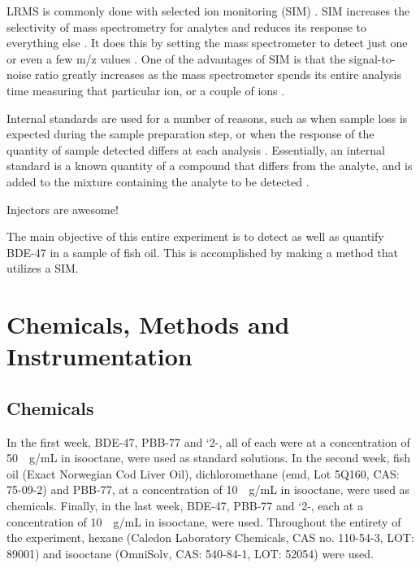 \documentclass[a4paper, 12pt]{article}
\begin{document}
LRMS is commonly done with selected ion monitoring (SIM) \cite{bjorklund_mass_2003}. SIM increases the selectivity of mass spectrometry for analytes and reduces its response to everything else \cite{harris}. It does this by setting the mass spectrometer to detect just one or even a few m/z values \cite{harris}. One of the advantages of SIM is that the signal-to-noise ratio greatly increases as the mass spectrometer spends its entire analysis time measuring that particular ion, or a couple of ions \cite{harris}.

Internal standards are used for a number of reasons, such as when sample loss is expected during the sample preparation step, or when the response of the quantity of sample detected differs at each analysis \cite{harris}. Essentially, an internal standard is a known quantity of a compound that differs from the analyte, and is added to the mixture containing the analyte to be detected \cite{harris}. 

Injectors are awesome!

The main objective of this entire experiment is to detect as well as quantify BDE-47 in a sample of fish oil. This is accomplished by making a method that utilizes a SIM.


\section{Chemicals, Methods and Instrumentation}

\subsection{Chemicals}
In the first week, BDE-47, PBB-77 and `2-, all of each were at a concentration of \SI{50}{\mu{}g/mL} in isooctane, were used as standard solutions. In the second week, fish oil (Exact Norwegian Cod Liver Oil), dichloromethane (emd, Lot 5Q160, CAS: 75-09-2) and PBB-77, at a concentration of \SI{10}{\mu{}g/mL} in isooctane, were used as chemicals. Finally, in the last week, BDE-47, PBB-77 and `2-, each at a concentration of \SI{10}{\mu{}g/mL} in isooctane, were used. Throughout the entirety of the experiment, hexane (Caledon Laboratory Chemicals, CAS no. 110-54-3, LOT: 89001) and isooctane (OmniSolv, CAS: 540-84-1, LOT: 52054) were used.
\end{document}
